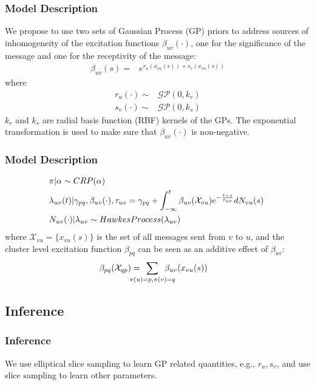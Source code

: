 \documentclass{beamer}
\newcommand{\XX}{{\mathcal X}}
\begin{document}
\begin{frame}
\frametitle{Model Description}
We propose to use two sets of Gaussian Process (GP) priors to address sources of inhomogeneity of the excitation functions $\beta_{uv}(\cdot)$, one for the significance of the message and one for the receptivity of the message:
\begin{align}
\beta_{uv}(s) =& e^{r_{u}(x_{vu}(s)) + s_{v}(x_{vu}(s))}\label{beta}
\end{align}
where
\begin{align}
  r_u(\cdot) \sim & \mathcal{GP}(0, k_r)\\
  s_v(\cdot) \sim & \mathcal{GP}(0, k_s)
\end{align}
$k_r$ and $k_s$ are radial basis function (RBF) kernels of the GPs. The exponential transformation is used to make sure that $\beta_{uv}(\cdot)$ is non-negative.

\end{frame}


\begin{frame}
\frametitle{Model Description}
\fontsize{10pt}{7.2}\selectfont
\begin{alignat}{3}
  &\pi | \alpha \sim CRP(\alpha)\\
  &\lambda_{uv}(t) | \gamma_{pq},\beta_{uv}(\cdot),\tau_{uv} = \gamma_{pq} + \int_{-\infty}^t \beta_{uv}(\XX_{vu}) e^{-\frac{t-s}{\tau_{uv}}} dN_{vu}(s)\hspace{1mm}\\
  &N_{uv}(\cdot) | \lambda_{uv} \sim HawkesProcess(\lambda_{uv})  
\end{alignat}
where $\XX_{vu} = \{x_{vu}(s)\}$ is the set of all messages sent from $v$ to $u$, and the cluster level excitation function $\beta_{pq}$ can be seen as an additive effect of $\beta_{uv}$:
\begin{align}
	\beta_{pq}(\XX_{qp}) =& \hspace{-5mm} \sum\limits_{\pi(u)=p, \pi(v)=q} \hspace{-5mm} \beta_{uv}(x_{vu}(s))
\end{align}

\end{frame}

\subsection{Inference}
\begin{frame}
\frametitle{Inference}
We use elliptical slice sampling to learn GP related quantities, e.g., $r_u, s_v$, and use slice sampling to learn other parameters.
\end{frame}
\end{document}
